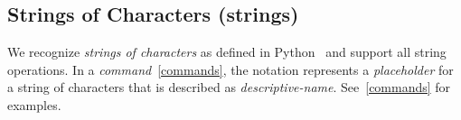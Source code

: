 \subsection{Strings of Characters (strings)}
\label{math_strings}

We recognize \emph{strings of characters} as defined in Python~\cite{python_string} and support all string operations. In a \emph{command}~\ref{commands}, the notation  represents a \emph{placeholder} for a string of characters that is described as \emph{descriptive-name}. See~\ref{commands} for examples.